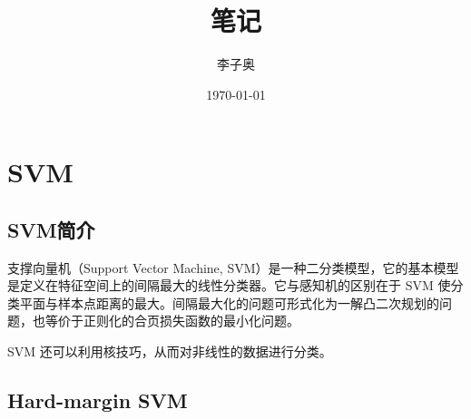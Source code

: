 \documentclass[forprint]{report}
\begin{document}

\title{笔记} %
\author{李子奥} %
\date{\today} %


\maketitle
\frontmatter
{}              %

\tableofcontents
\thispagestyle{empty}				%


\mainmatter %
\pagestyle{plain}%
\baselineskip=23pt  %

\chapter{SVM}

\section{SVM简介}

支撑向量机（Support Vector Machine, SVM）是一种二分类模型\cite{r3}，它的基本模型是定义在特征空间上的间隔最大的线性分类器。它与感知机的区别在于 SVM 使分类平面与样本点距离的最大。间隔最大化的问题可形式化为一解凸二次规划的问题，也等价于正则化的合页损失函数的最小化问题。


SVM 还可以利用核技巧，从而对非线性的数据进行分类。

\section{Hard-margin SVM}
\end{document}

